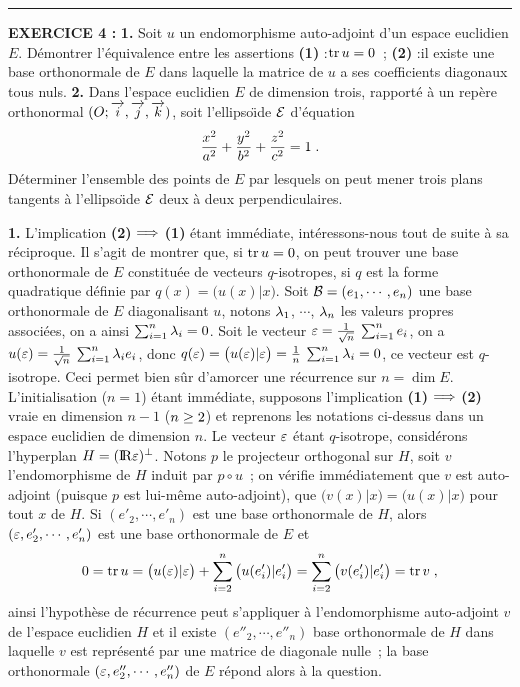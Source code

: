 \documentclass{article}
\begin{document}
\bsk
\hrule
\bsk

{\bf EXERCICE 4 :}\msk
{\bf 1.} Soit $u$ un endomorphisme auto-adjoint d'un espace euclidien $E$. D\'emontrer l'\'equivalence entre les assertions\ssk\sect
{\bf (1)} :\qquad $\mathop{\rm tr}\nolimits u=0$~;\ssk\sect
{\bf (2)} :\qquad il existe une base orthonormale de $E$ dans laquelle la matrice de $u$ a ses coefficients diagonaux tous nuls.
\msk
{\bf 2.} Dans l'espace euclidien $E$ de dimension trois, rapport\'e \`a un rep\`ere orthonormal $(O;\vect{i},\vect{j},\vect{k})$, soit l'ellipso\"\i de ${\cal E}$ d'\'equation\vv
$${x^2\over a^2}+{y^2\over b^2}+{z^2\over c^2}=1\;.$$\sect
D\'eterminer l'ensemble des points de $E$ par lesquels on peut mener trois plans tangents \`a l'ellipso\"\i de ${\cal E}$ deux \`a deux perpendiculaires.


\msk
\cl{- - - - - - - - - - - - - - - - - - - - - - - - - - - - - - - }
\msk

{\bf 1.} L'implication {\bf (2)} $\Longrightarrow$ {\bf (1)} \'etant imm\'ediate, int\'eressons-nous tout de suite \`a sa r\'eciproque.\msk\sect
Il s'agit de montrer que, si $\mathop{\rm tr}\nolimits u=0$, on peut trouver une base orthonormale de $E$ constitu\'ee de vecteurs $q$-isotropes, si $q$ est la forme quadratique d\'efinie par $q(x)=\big(u(x)|x\big)$. Soit ${\cal B}=(e_1,\cdots,e_n)$ une base orthonormale de $E$ diagonalisant $u$, notons $\lambda_1$, $\cdots$, $\lambda_n$ les valeurs propres associ\'ees, on a ainsi $\sum_{i=1}^n\lambda_i=0$. Soit le vecteur $\varepsilon={1\over\sqrt{n}}\>\sum_{i=1}^ne_i$, on a\break $u(\varepsilon)={1\over\sqrt{n}}\>\sum_{i=1}^n\lambda_ie_i$, donc $q(\varepsilon)=\big(u(\varepsilon)|\varepsilon\big)={1\over n}\>\sum_{i=1}^n\lambda_i=0$, ce vecteur est $q$-isotrope.\ssk\sect
Ceci permet bien s\^ur d'amorcer une r\'ecurrence sur $n=\dim E$. L'initialisation ($n=1$) \'etant imm\'ediate, supposons l'implication {\bf (1)} $\Longrightarrow$ {\bf (2)} vraie en dimension $n-1$ ($n\geq2$) et reprenons les notations ci-dessus dans un espace euclidien de dimension $n$. Le vecteur $\varepsilon$ \'etant $q$-isotrope, consid\'erons l'hyperplan $H=({\rm I\kern-0.6mm R}\varepsilon)^{\perp}$. Notons $p$ le projecteur orthogonal sur $H$, soit $v$ l'endomorphisme de $H$ induit par $p\circ u$~; on v\'erifie imm\'ediatement que $v$ est auto-adjoint (puisque $p$ est lui-m\^eme auto-adjoint), que $\big(v(x)|x\big)=\big(u(x)|x\big)$ pour tout $x$ de $H$. Si $(e'_2,\cdots,e'_n)$ est une base orthonormale de $H$, alors $(\varepsilon,e'_2,\cdots,e'_n)$ est une base orthonormale de $E$ et\vv
$$0=\mathop{\rm tr}\nolimits u=\big(u(\varepsilon)|\varepsilon\big)+\sum_{i=2}^n\big(u(e'_i)|e'_i\big)=\sum_{i=2}^n\big(v(e'_i)|e'_i\big)=\mathop{\rm tr}\nolimits v\;,$$
ainsi l'hypoth\`ese de r\'ecurrence peut s'appliquer \`a l'endomorphisme auto-adjoint $v$ de l'espace euclidien $H$ et il existe $(e''_2,\cdots,e''_n)$ base orthonormale de $H$ dans laquelle $v$ est repr\'esent\'e par une matrice de diagonale nulle~; la base orthonormale $(\varepsilon,e''_2,\cdots,e''_n)$ de $E$ r\'epond alors \`a la question.
\end{document}
